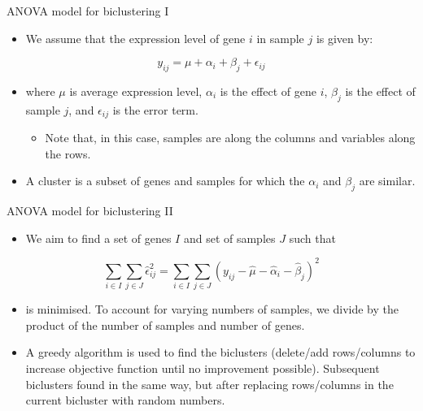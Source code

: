 \documentclass[
  ignorenonframetext,
  aspectratio=169,
]{beamer}
\providecommand{\tightlist}{%
  \setlength{\itemsep}{0pt}\setlength{\parskip}{0pt}}\usepackage{longtable,booktabs,array}
\begin{document}
\begin{frame}{ANOVA model for biclustering I}
\protect\hypertarget{anova-model-for-biclustering-i}{}
\begin{itemize}
\tightlist
\item
  We assume that the expression level of gene \(i\) in sample \(j\) is
  given by:
\end{itemize}

\[
y_{ij} = \mu + \alpha_i + \beta_j + \epsilon_{ij}
\]

\begin{itemize}
\tightlist
\item
  where \(\mu\) is average expression level, \(\alpha_i\) is the effect
  of gene \(i\), \(\beta_j\) is the effect of sample \(j\), and
  \(\epsilon_{ij}\) is the error term.

  \begin{itemize}
  \tightlist
  \item
    Note that, in this case, samples are along the columns and variables
    along the rows.
  \end{itemize}
\item
  A cluster is a subset of genes and samples for which the \(\alpha_i\)
  and \(\beta_j\) are similar.
\end{itemize}
\end{frame}

\begin{frame}{ANOVA model for biclustering II}
\protect\hypertarget{anova-model-for-biclustering-ii}{}
\begin{itemize}
\tightlist
\item
  We aim to find a set of genes \(I\) and set of samples \(J\) such that
\end{itemize}

\[
\sum_{i\in I}\sum_{j\in J} \hat{\epsilon}_{ij}^2=\sum_{i\in I}\sum_{j\in J} (y_{ij} - \hat{\mu} - \hat{\alpha}_i - \hat{\beta}_j)^2
\]

\begin{itemize}
\tightlist
\item
  is minimised. To account for varying numbers of samples, we divide by
  the product of the number of samples and number of genes.
\item
  A greedy algorithm is used to find the biclusters (delete/add
  rows/columns to increase objective function until no improvement
  possible). Subsequent biclusters found in the same way, but after
  replacing rows/columns in the current bicluster with random numbers.
\end{itemize}
\end{frame}
\end{document}
